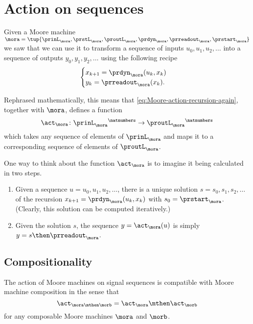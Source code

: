
\section{Action on sequences}


Given a Moore machine $\mora = \tup{\prinL_\mora,\prstL_\mora,\proutL_\mora,\prdyn_\mora,\prreadout_\mora,\prstart_\mora}$
we saw that we can use it to transform a sequence of inputs $u_0, u_1, u_2, \dots$ into a sequence of outputs $y_0, y_1, y_2, \dots$ using the following recipe
\begin{equation}
    \label{eq:Moore-action-recursion-again}
    \begin{cases}
        x_{k+1} = \prdyn_\mora(u_k, x_k) \\
        y_{k}   = \prreadout_\mora(x_{k}).
    \end{cases}
\end{equation}

Rephrased mathematically, this means that \cref{eq:Moore-action-recursion-again}, together with $\mora$, defines a function $$ \act_{\mora} \colon {\prinL_\mora}^\natnumbers \to {\proutL_\mora}^\natnumbers$$ which takes any sequence  of elements of $\prinL_\mora$ and maps it to a corresponding sequence  of elements of $\proutL_\mora$.  


\begin{remark}
\label{re:moore-action-two-steps}
One way to think about the function $\act_{\mora}$ is to imagine it being calculated in two steps. 
\begin{enumerate}
\item Given a sequence $u = u_0, u_1, u_2, \dots$, there is a unique solution $s = s_0, s_1, s_2, \dots$ of the recursion $x_{k+1} = \prdyn_\mora(u_k, x_k)$ with $s_0 = \prstart_\mora$. (Clearly, this solution can be computed iteratively.) 
\item Given the solution $s$, the sequence $y = \act_{\mora}(u)$ is simply $y = s \then \prreadout_\mora$. 
\end{enumerate}
\end{remark}

\subsection{Compositionality}

\begin{proposition}
The action of Moore machines on signal sequences is compatible with Moore machine composition in the sense that
\begin{equation}
\label{eq:moore-action-compositional}
\act_{\mora \mthen \morb} = \act_\mora \mthen \act_\morb
\end{equation}
for any composable Moore machines $\mora$ and $\morb$. 
\end{proposition}

